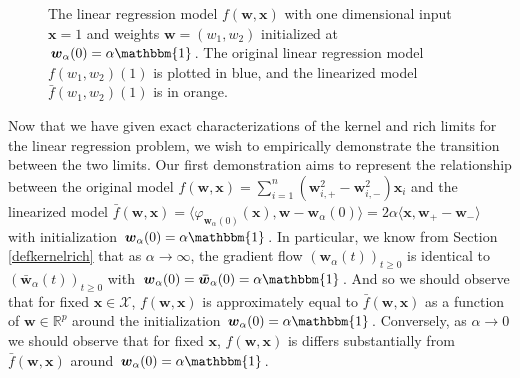 \documentclass{article}
\begin{document}
\begin{figure}[H]
    \centering
    \hfill
    \caption{The linear regression model $f(\boldsymbol{w}, \boldsymbol{x})$ with one dimensional input $\boldsymbol{x} = 1$ and weights $\boldsymbol{w} = (w_1, w_2)$ initialized at $\boldsymbol{w}_{\alpha}(0) = \alpha \mathbbm{1}$. The original linear regression model $f(w_1, w_2)(1)$ is plotted in blue, and the linearized model $\bar{f}(w_1, w_2)(1)$ is in orange.}\label{img:linearization}
\end{figure}

Now that we have given exact characterizations of the kernel and rich limits for the linear regression problem, we wish to empirically demonstrate the transition between the two limits. Our first demonstration aims to represent the relationship between the original model $f(\boldsymbol{w}, \boldsymbol{x}) = \sum_{i=1}^n (\boldsymbol{w}_{i,+}^2 - \boldsymbol{w}_{i,-}^2)\boldsymbol{x}_i$ and the linearized model $\bar{f}(\boldsymbol{w}, \boldsymbol{x}) = \langle \varphi_{\boldsymbol{w}_{\alpha}(0)}(\boldsymbol{x}), \boldsymbol{w} - \boldsymbol{w}_{\alpha}(0) \rangle = 2\alpha \langle \boldsymbol{x} , \boldsymbol{w}_+ - \boldsymbol{w}_-\rangle$ with initialization $\boldsymbol{w}_{\alpha}(0) = \alpha \mathbbm{1}$. In particular, we know from Section \ref{defkernelrich} that as $\alpha \rightarrow \infty$, the gradient flow $(\boldsymbol{w}_{\alpha}(t))_{t \geq 0}$ is identical to $(\boldsymbol{\bar{w}}_{\alpha}(t))_{t \geq 0}$ with $\boldsymbol{w}_{\alpha}(0) = \boldsymbol{\bar{w}}_{\alpha}(0) = \alpha \mathbbm{1}$. And so we should observe that for fixed $\boldsymbol{x} \in \mathcal{X}$, $f(\boldsymbol{w}, \boldsymbol{x})$ is approximately equal to $\bar{f}(\boldsymbol{w}, \boldsymbol{x})$ as a function of $\boldsymbol{w} \in \mathbb{R}^p$ around the initialization $\boldsymbol{w}_{\alpha}(0) = \alpha \mathbbm{1}$. Conversely, as $\alpha \rightarrow 0$ we should observe that for fixed $\boldsymbol{x}$, $f(\boldsymbol{w}, \boldsymbol{x})$ is differs substantially from $\bar{f}(\boldsymbol{w}, \boldsymbol{x})$ around $\boldsymbol{w}_{\alpha}(0) = \alpha \mathbbm{1}$.
\end{document}
